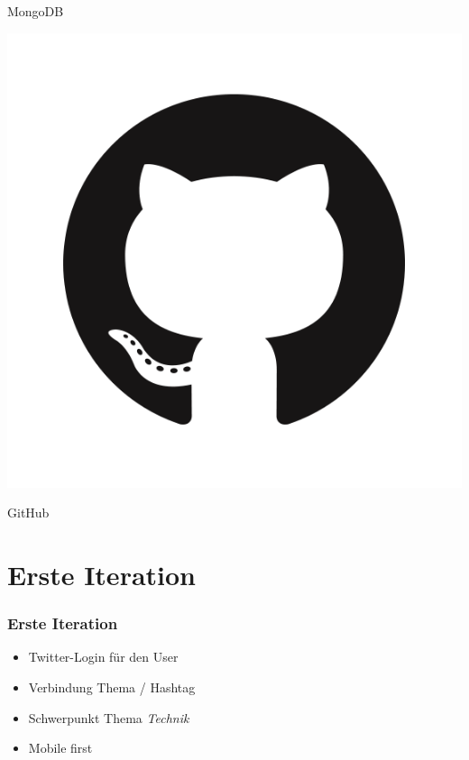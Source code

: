 \documentclass{beamer}
\begin{document}
\begin{frame}
\begin{minipage}{.3\textwidth}
  \end{minipage}%
  \hfill
  \begin{minipage}{.7\textwidth}
    MongoDB \pause \\    
  \end{minipage}
  \begin{minipage}{.3\textwidth}
    \includegraphics[height=.3\textheight]{GitHub}
  \end{minipage}%
  \hfill
  \begin{minipage}{.7\textwidth}
    GitHub \\    
  \end{minipage}

\end{frame}

\section{Erste Iteration}
\begin{frame}
  \frametitle{Erste Iteration}
  \begin{itemize}
    \item Twitter-Login für den User \pause
    \item Verbindung Thema / Hashtag \pause
    \item Schwerpunkt Thema \textit{Technik} \pause
    \item Mobile first
  \end{itemize}
  
\end{frame}
\end{document}
